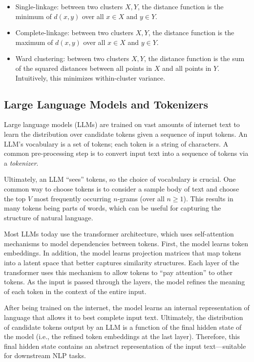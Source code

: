 \documentclass{article}
\begin{document}
\begin{itemize}
  \item Single-linkage: between two clusters $X, Y$, the distance function is the minimum of $d(x, y)$ over all $x \in X$ and $y \in Y$.
  \item Complete-linkage: between two clusters $X, Y$, the distance function is the maximum of $d(x, y)$ over all $x \in X$ and $y \in Y$.
  \item Ward clustering: between two clusters $X, Y$, the distance function is the sum of the squared distances between all points in $X$ and all points in $Y$. Intuitively, this minimizes within-cluster variance.
\end{itemize}

\subsection{Large Language Models and Tokenizers}

Large language models (LLMs) are trained on vast amounts of internet text to learn the distribution over candidate tokens given a sequence of input tokens. An LLM's vocabulary is a set of tokens; each token is a string of characters. A common pre-processing step is to convert input text into a sequence of tokens via a \emph{tokenizer}.

Ultimately, an LLM ``sees'' tokens, so the choice of vocabulary is crucial. One common way to choose tokens is to consider a sample body of text and choose the top $V$ most frequently occurring $n$-grams (over all $n\ge 1$). This results in many tokens being parts of words, which can be useful for capturing the structure of natural language.

Most LLMs today use the transformer architecture, which uses self-attention mechanisms to model dependencies between tokens. First, the model learns token embeddings. In addition, the model learns projection matrices that map tokens into a latent space that better captures similarity structures. Each layer of the transformer uses this mechanism to allow tokens to ``pay attention'' to other tokens. As the input is passed through the layers, the model refines the meaning of each token in the context of the entire input.

After being trained on the internet, the model learns an internal representation of language that allows it to best complete input text. Ultimately, the distribution of candidate tokens output by an LLM is a function of the final hidden state of the model (i.e., the refined token embeddings at the last layer). Therefore, this final hidden state contains an abstract representation of the input text---suitable for downstream NLP tasks.
\end{document}
